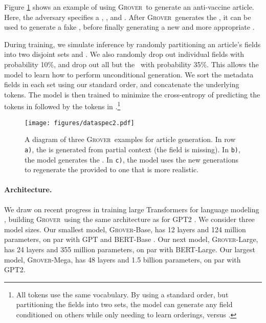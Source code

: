 \documentclass{article}
\newcommand{\modelname}{{\textsc{Grover}}}
\begin{document}
Figure \ref{fig:setup} shows an example of using \modelname~to generate an anti-vaccine article. Here, the adversary specifies a \domainfield, \datefield, and \headlinefield. After \modelname~generates the \bodyfield, it can be used to generate a fake \authorfield, before finally generating a new and more appropriate \headlinefield.

During training, we simulate inference by randomly partitioning an article's fields into two disjoint sets  and . We also randomly drop out individual fields with probability 10\%, and drop out all but the \bodyfield~with probability 35\%. This allows the model to learn how to perform unconditional generation. We sort the metadata fields in each set using our standard order, and concatenate the underlying tokens. The model is then trained to minimize the cross-entropy of predicting the tokens in  followed by the tokens in .\footnote{All tokens use the same vocabulary. By using a standard order, but partitioning the fields into two sets, the model can generate any field conditioned on others while only needing to learn  orderings, versus .}

\begin{figure}[t!]
  \centering\small
    \texttt{[image: figures/dataspec2.pdf]}
    \vspace{-4mm}
\caption{A diagram of three \modelname~examples for article generation. In row {\tt\small a)}, the  is generated from partial context (the  field is missing). In {\tt\small b)}, the model generates the . In {\tt\small c)}, the model uses the new generations to regenerate the provided  to one that is more realistic.}\vspace{-3mm}
  \label{fig:setup}
\end{figure}

\paragraph{Architecture.}
We draw on recent progress in training large Transformers for language modeling \citep{vaswani2017attention}, building \modelname~using the same architecture as for GPT2 \citep{radford2019gpttwo}. We consider three model sizes. Our smallest model, \modelname-Base, has 12 layers and 124 million parameters, on par with GPT and BERT-Base \citep{radford2018improving,devlin2018bert}. Our next model, \modelname-Large, has 24 layers and 355 million parameters, on par with BERT-Large. Our largest model, \modelname-Mega, has 48 layers and 1.5 billion parameters, on par with GPT2.
\end{document}
